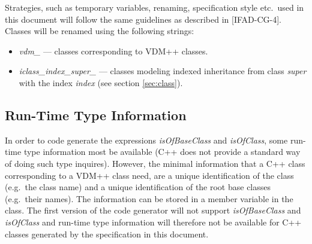 \documentclass[a4paper,dvips]{article}
\begin{document}
Strategies, such as temporary variables, renaming, specification
style etc.\ used in this document will follow the same guidelines as
described in [IFAD-CG-4]. Classes will be renamed using
the following strings:

\begin{itemize}
\item {\em vdm\_\/} --- classes corresponding to VDM++ classes.

\item {\em iclass\_index\_super\_\/} --- classes modeling indexed
  inheritance from class {\em super\/} with the index {\em index\/}
  (see section \ref{sec:class}).

\end{itemize}


%
%
%
%
%
%

\subsection{Run-Time Type Information}

In order to code generate the expressions {\em isOfBaseClass} and {\em
  isOfClass}, some run-time type information most be available (C++
does not provide a standard way of doing such type inquires). However,
the minimal information that a C++ class corresponding to a VDM++
class need, are a unique identification of the class (e.g.\ the class
name) and a unique identification of the root base classes (e.g.\ 
their names). The information can be stored in a member
variable in the class. The first version of the code generator will
not support {\em isOfBaseClass} and {\em isOfClass} and run-time type
information will therefore not be available for C++ classes generated
by the specification in this document.
\end{document}
